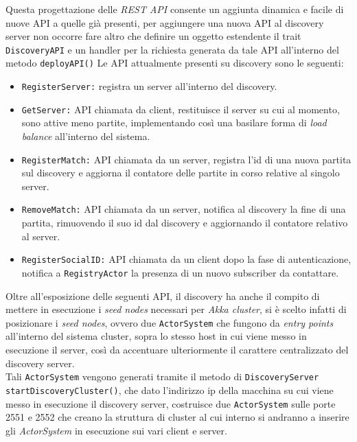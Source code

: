 Questa progettazione delle \textit{REST API} consente un aggiunta dinamica e facile di nuove API a quelle già presenti, per aggiungere una nuova API al discovery server non occorre fare altro che definire un oggetto estendente il trait \texttt{DiscoveryAPI} e un handler per la richiesta generata da tale API all'interno del metodo \texttt{deployAPI()}
Le API attualmente presenti su discovery sono le seguenti:

\begin{itemize}
  \item{\texttt{RegisterServer:}} registra un server all'interno del discovery.

  \item{\texttt{GetServer:}} API chiamata da client, restituisce il server su cui al momento, sono attive meno partite, implementando così una basilare forma di \textit{load balance} all'interno del sistema.

  \item{\texttt{RegisterMatch:}} API chiamata da un server, registra l'id di una nuova partita sul discovery e aggiorna il contatore delle partite in corso relative al singolo server.

  \item{\texttt{RemoveMatch:}} API chiamata da un server, notifica al discovery la fine di una partita, rimuovendo il suo id dal discovery e aggiornando il contatore relativo al server.

  \item{\texttt{RegisterSocialID:}} API chiamata da un client dopo la fase di autenticazione, notifica a \texttt{RegistryActor} la presenza di un nuovo subscriber da contattare.
\end{itemize}

Oltre all'esposizione delle seguenti API, il discovery ha anche il compito di mettere in esecuzione i \textit{seed nodes} necessari per \textit{Akka cluster}, si è scelto infatti di posizionare i \textit{seed nodes}, ovvero due \texttt{ActorSystem} che fungono da \textit{entry points} all'interno del sistema cluster, sopra lo stesso host in cui viene messo in esecuzione il server, così da accentuare ulteriormente il carattere centralizzato del discovery server.\\
 Tali \texttt{ActorSystem} vengono generati tramite il metodo di \texttt{DiscoveryServer} \texttt{startDiscoveryCluster()}, che dato l'indirizzo ip della macchina su cui viene messo in esecuzione il discovery server, costruisce due \texttt{ActorSystem} sulle porte 2551 e 2552 che creano la struttura di cluster al cui interno si andranno a inserire gli \textit{ActorSystem} in esecuzione sui vari client e server.

